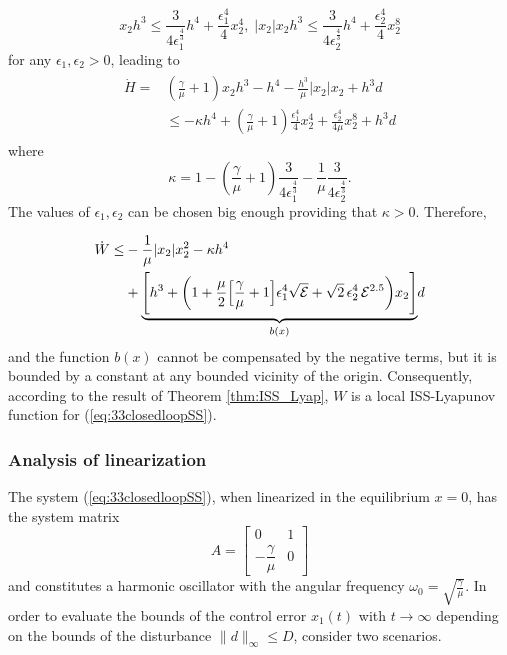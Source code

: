 \documentclass[letterpaper, 10 pt, conference]{ieeeconf}  %
\begin{document}
\[
x_{2}h^{3}\leq\frac{3}{4\epsilon_{1}^{\frac{4}{3}}}h^{4}+\frac{\epsilon_{1}^{4}}{4}x_{2}^{4},\;|x_{2}|x_{2}h^{3}\leq\frac{3}{4\epsilon_{2}^{\frac{4}{3}}}h^{4}+\frac{\epsilon_{2}^{4}}{4}x_{2}^{8}
\]
for any $\epsilon_{1},\epsilon_{2}>0$, leading to
\begin{gather*}
\begin{aligned}
\dot{H} = & \left(\frac{\gamma}{\mu}+1\right)x_{2}h^{3}-h^{4}-\frac{h^{3}}{\mu}|x_{2}|x_{2}+h^{3}d \\
& \leq-  \kappa h^{4}+\left(\frac{\gamma}{\mu}+1\right)\frac{\epsilon_{1}^{4}}{4}x_{2}^{4}+\frac{\epsilon_{2}^{4}}{4\mu}x_{2}^{8}+h^{3}d
\end{aligned}
\end{gather*}
where
\[
\kappa=1-\left(\frac{\gamma}{\mu}+1\right)\frac{3}{4\epsilon_{1}^{\frac{4}{3}}}-\frac{1}{\mu}\frac{3}{4\epsilon_{2}^{\frac{4}{3}}}.
\]
The values of $\epsilon_{1},\epsilon_{2}$ can be chosen big enough
providing that $\kappa>0$. Therefore,

\[
\begin{aligned}\dot{W}\leq & -\frac{1}{\mu}|x_{2}|x_{2}^{2}-\kappa h^{4}\\
 & +\underset{b(x)}{\underbrace{\Biggl[h^{3}+\biggl(1+\frac{\mu}{2}\Bigl[\frac{\gamma}{\mu}+1\Bigr]\epsilon_{1}^{4}\sqrt{\mathcal{E}}+\sqrt{2}\,\epsilon_{2}^{4}\,\mathcal{E}^{2.5}\biggr)x_{2}\Biggr]}}d
\end{aligned}
\]
and the function $b(x)$ cannot be compensated by the negative terms,
but it is bounded by a constant at any bounded vicinity of the origin.
Consequently, according to the result of Theorem \ref{thm:ISS_Lyap},
$W$ is a local ISS-Lyapunov function for (\ref{eq:33closedloopSS}).



\subsubsection{Analysis of linearization}

The system (\ref{eq:33closedloopSS}), when linearized in the equilibrium
$x=0$, has the system matrix 
\begin{equation}
A=\left[\begin{array}{cc}
0 & 1\\[1mm]
-\dfrac{\gamma}{\mu} & 0
\end{array}\right]\label{eq:SysMatrix}
\end{equation}
and constitutes a harmonic oscillator with the angular frequency $\omega_{0}=\sqrt{\frac{\gamma}{\mu}}$.
In order to evaluate the bounds of the control error $x_{1}(t)$ with
$t\rightarrow\infty$ depending on the bounds of the disturbance $\|d\|_{\infty}\leq D$,
consider two scenarios. 
\end{document}
